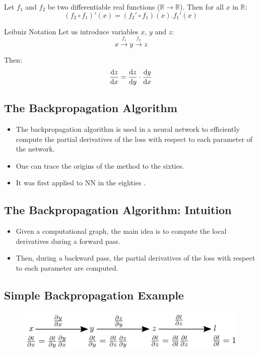 \documentclass{book}
\newcommand{\R}{\mathbb{R}}
\begin{document}
\begin{myblock}{}
Let $f_1$ and $f_2$ be two differentiable real functions ($\R \rightarrow \R$). Then for all $x$ in $\R$:
\[
(f_2 \circ f_1)'(x) = (f_2'\circ f_1)(x).f_1'(x)
\]
\end{myblock}

\begin{myblock}{Leibniz Notation}
Let us introduce variables $x$, $y$ and $z$:
\[x \xrightarrow{f_1} y \xrightarrow{f_2} z\]

Then:
\[\dv{z}{x} = \dv{z}{y} \cdot \dv{y}{x} \]
\end{myblock}

\subsection{The Backpropagation Algorithm}

\begin{itemize}
\item The backpropagation algorithm is used in a neural network to efficiently compute the partial derivatives of the loss with respect to each parameter of the network.
\item One can trace the origins of the method to the sixties.
\item It was first applied to NN in the eighties \cite{werbos_applications_1982, lecun_procedure_1985}.
\end{itemize}

\subsection{The Backpropagation Algorithm: Intuition}

\begin{itemize}
\item Given a computational graph, the main idea is to compute the local derivatives during a forward pass.
\item Then, during a backward pass, the partial derivatives of the loss with respect to each parameter are computed.
\end{itemize}

\subsection{Simple Backpropagation Example}

\begin{figure}[h]
    \centering
    \includegraphics[width=\textwidth]{bp_simple.png}
\end{figure}
\end{document}
